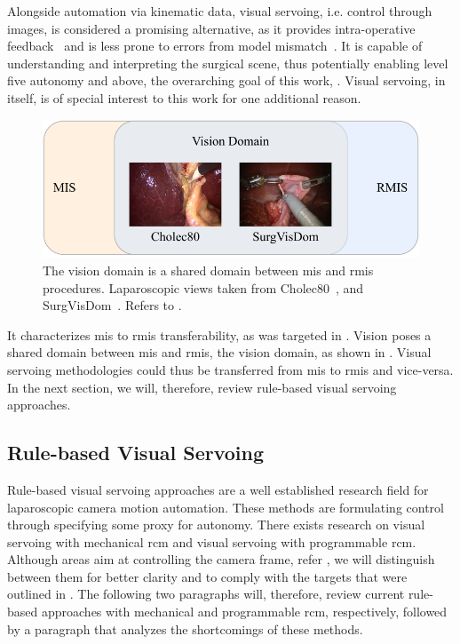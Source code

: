 
Alongside automation via kinematic data, visual servoing, i.e. control through images, is considered a promising alternative, as it provides intra-operative feedback~\cite{pandya2014review} and is less prone to errors from model mismatch~\cite{azizian2014visual}. It is capable of understanding and interpreting the surgical scene, thus potentially enabling level five autonomy and above, the overarching goal of this work, . Visual servoing, in itself, is of special interest to this work for one additional reason.
\begin{figure}[htb]
    \centering
    \includegraphics{introduction/fig/shared_domain.pdf}
    \caption{The vision domain is a shared domain between \gls{mis} and \gls{rmis} procedures. Laparoscopic views taken from Cholec80~\cite{twinanda2016endonet}, and SurgVisDom~\cite{zia2021surgical}. Refers to .}
    \label{in:fig:shared_domain}
\end{figure}
It characterizes \gls{mis} to \gls{rmis} transferability, as was targeted in . Vision poses a shared domain between \gls{mis} and \gls{rmis}, the vision domain, as shown in . Visual servoing methodologies could thus be transferred from \gls{mis} to \gls{rmis} and vice-versa. In the next section, we will, therefore, review rule-based visual servoing approaches.

\subsection{Rule-based Visual Servoing}
\label{in:sec:rule_based_approaches}
Rule-based visual servoing approaches are a well established research field for laparoscopic camera motion automation. These methods are formulating control through specifying some proxy for autonomy. There exists research on visual servoing with mechanical \gls{rcm} and visual servoing with programmable \gls{rcm}. Although areas aim at controlling the camera frame, refer , we will distinguish between them for better clarity and to comply with the targets that were outlined in . The following two paragraphs will, therefore, review current rule-based approaches with mechanical and programmable \gls{rcm}, respectively, followed by a paragraph that analyzes the shortcomings of these methods.

